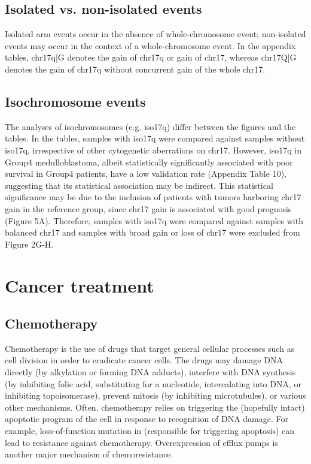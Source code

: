 \subsection{Isolated vs. non-isolated events}

Isolated arm events occur in the absence of whole-chromosome event; non-isolated events may occur in the context of a whole-chromosome event. In the appendix tables, chr17q|G denotes the gain of chr17q or gain of chr17, whereas chr17Q|G denotes the gain of chr17q without concurrent gain of the whole chr17.

\subsection{Isochromosome events}

The analyses of isochromosomes (e.g. iso17q) differ between the figures and the tables. In the tables, samples with iso17q were compared against samples without iso17q, irrespective of other cytogenetic aberrations on chr17. However, iso17q in Group4 medulloblastoma, albeit statistically significantly associated with poor survival in Group4 patients, have a low validation rate (Appendix Table 10), suggesting that its statistical association may be indirect. This statistical significance may be due to the inclusion of patients with tumors harboring chr17 gain in the reference group, since chr17 gain is associated with good prognosis (Figure 5A). Therefore, samples with iso17q were compared against samples with balanced chr17 and samples with broad gain or loss of chr17 were excluded from Figure 2G-H.


\section{Cancer treatment}
\label{sec:cancer-treatment}

\subsection{Chemotherapy}

Chemotherapy is the use of drugs that target general cellular processes such as cell division in order to eradicate cancer cells. The drugs may damage DNA directly (by alkylation or forming DNA adducts), interfere with DNA synthesis (by inhibiting folic acid, substituting for a nucleotide, intercalating into DNA, or inhibiting topoisomerase), prevent mitosis (by inhibiting microtubules), or various other mechanisms. Often, chemotherapy relies on triggering the (hopefully intact) apoptotic program of the cell in response to recognition of DNA damage. For example, loss-of-function mutation in  (responsible for triggering apoptosis) can lead to resistance against chemotherapy. Overexpression of efflux pumps is another major mechanism of chemoresistance.

